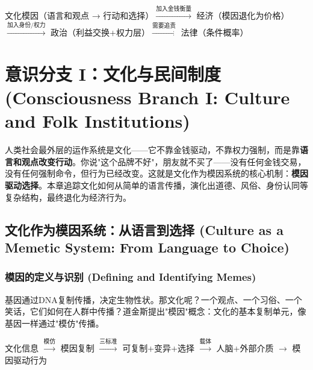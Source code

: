 \documentclass[../main.tex]{subfiles}
\begin{document}
	\begin{logicmap}

		文化模因（语言和观点 → 行动和选择）$\xrightarrow{\text{加入金钱衡量}}$ 经济（模因退化为价格）$\xrightarrow{\text{加入身份/权力}}$ 政治（利益交换+权力层）$\xrightarrow{\text{需要追责}}$ 法律（条件概率）

	\end{logicmap}

	\chapter{意识分支 I：文化与民间制度 (Consciousness Branch I: Culture and Folk Institutions)}

	\begin{motivation}

		人类社会最外层的运作系统是文化——它不靠金钱驱动，不靠权力强制，而是靠\textbf{语言和观点改变行动}。你说"这个品牌不好"，朋友就不买了——没有任何金钱交易，没有任何强制命令，但行为已经改变。这就是文化作为模因系统的核心机制：\textbf{模因驱动选择}。本章追踪文化如何从简单的语言传播，演化出道德、风俗、身份认同等复杂结构，最终退化为经济行为。

	\end{motivation}

	\section{文化作为模因系统：从语言到选择 (Culture as a Memetic System: From Language to Choice)}

	\subsection{模因的定义与识别 (Defining and Identifying Memes)}

	\begin{motivation}

		基因通过DNA复制传播，决定生物性状。那文化呢？一个观点、一个习俗、一个笑话，它们如何在人群中传播？道金斯提出"模因"概念：文化的基本复制单元，像基因一样通过"模仿"传播。

	\end{motivation}

	\begin{logicmap}

		文化信息 $\xrightarrow{\text{模仿}}$ 模因复制 $\xrightarrow{\text{三标准}}$ 可复制+变异+选择 $\xrightarrow{\text{载体}}$ 人脑+外部介质 $\rightarrow$ 模因驱动行为

	\end{logicmap}
\end{document}

